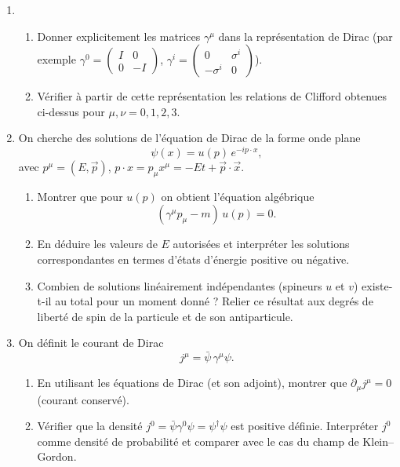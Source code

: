 \documentclass[a4paper,10pt]{report}
\begin{document}
\begin{enumerate}
	\item 
	\begin{enumerate}
		\item Donner explicitement les matrices $\gamma^\mu$ dans la représentation de Dirac (par exemple $\gamma^0 = \begin{pmatrix}I & 0\\ 0 & -I\end{pmatrix}$, $\gamma^i = \begin{pmatrix}0 & \sigma^i\\ -\sigma^i & 0\end{pmatrix}$). 
		\item Vérifier à partir de cette représentation les relations de Clifford obtenues ci-dessus pour $\mu,\nu=0,1,2,3$.
	\end{enumerate}
	
	\item On cherche des solutions de l'équation de Dirac de la forme onde plane 
	\[
	\psi(x) = u(p)\,e^{-ip\cdot x}, 
	\]
	avec $p^\mu=(E,\vec p)$, $p\cdot x = p_\mu x^\mu = -E t + \vec p\cdot\vec x$. 
	\begin{enumerate}
		\item Montrer que pour $u(p)$ on obtient l'équation algébrique 
		\[
		(\gamma^\mu p_\mu - m)\,u(p) = 0.
		\]
		\item En déduire les valeurs de $E$ autorisées et interpréter les solutions correspondantes en termes d'états d'énergie positive ou négative. 
		\item Combien de solutions linéairement indépendantes (spineurs $u$ et $v$) existe-t-il au total pour un moment donné ? Relier ce résultat aux degrés de liberté de spin de la particule et de son antiparticule.
	\end{enumerate}
	
	\item On définit le courant de Dirac 
	\[
	j^\mu = \bar\psi\,\gamma^\mu \psi.
	\]
	\begin{enumerate}
		\item En utilisant les équations de Dirac (et son adjoint), montrer que $\partial_\mu j^\mu=0$ (courant conservé). 
		\item Vérifier que la densité $j^0 = \bar\psi \gamma^0 \psi = \psi^\dagger \psi$ est positive définie. Interpréter $j^0$ comme densité de probabilité et comparer avec le cas du champ de Klein--Gordon.
	\end{enumerate}
	

\end{enumerate}
\end{document}
